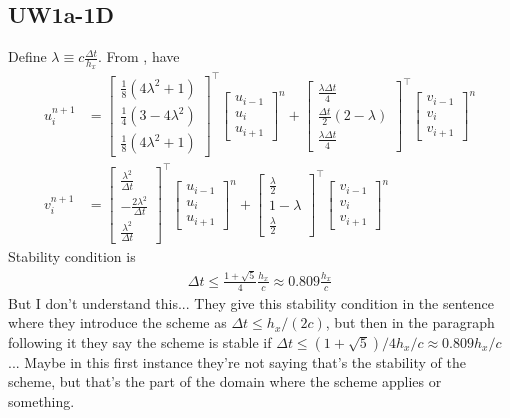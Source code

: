 \documentclass[12pt]{article}
\begin{document}
\subsection{UW1a-1D}
Define $\lambda \equiv c \tfrac{\Delta t}{h_x}$.
From \cite[eqn. (7) \& (8)]{Banks2012}, have
\begin{align}
u_{i}^{n+1} &= 
\begin{bmatrix}
\tfrac{1}{8} (4 \lambda^2 + 1) \\
\tfrac{1}{4}(3 - 4 \lambda^2)  \\
\tfrac{1}{8} (4 \lambda^2 + 1) 
\end{bmatrix}^\top
\begin{bmatrix}
u_{i-1} \\
u_i  \\
u_{i+1} 
\end{bmatrix}^n 
+
\begin{bmatrix}
\tfrac{\lambda \Delta t}{4} \\
\tfrac{\Delta t}{2}(2 - \lambda) \\
\tfrac{\lambda \Delta t}{4} 
\end{bmatrix}^\top
\begin{bmatrix}
v_{i-1} \\
v_i  \\
v_{i+1} 
\end{bmatrix}^n 
\\
v_{i}^{n+1} &= 
\begin{bmatrix}
\tfrac{\lambda^2}{\Delta t} \\
- \tfrac{2 \lambda^2}{\Delta t} \\ 
\tfrac{\lambda^2}{\Delta t}  
\end{bmatrix}^\top
\begin{bmatrix}
u_{i-1} \\
u_i  \\
u_{i+1} 
\end{bmatrix}^n 
+
\begin{bmatrix}
\tfrac{\lambda}{2} \\
1 - \lambda \\
\tfrac{\lambda}{2} 
\end{bmatrix}^\top
\begin{bmatrix}
v_{i-1} \\
v_i  \\
v_{i+1} 
\end{bmatrix}^n 
\end{align}
Stability condition is
\begin{align}
\Delta t \leq \frac{1 + \sqrt{5}}{4} \frac{h_x}{c} \approx 0.809 \frac{h_x}{c}
\end{align}
But I don't understand this... They give this stability condition in the sentence where they introduce the scheme as $\Delta t \leq h_x/(2c )$, but then in the paragraph following it they say the scheme is stable if $\Delta t \leq (1 + \sqrt{5})/4 h_x /c \approx 0.809 h_x /c$... Maybe in this first instance they're not saying that's the stability of the scheme, but that's the part of the domain where the scheme applies or something.
\end{document}
